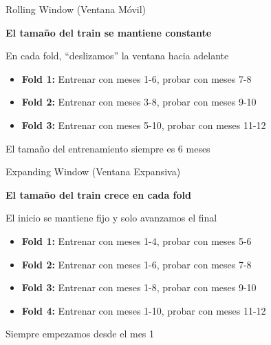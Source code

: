 \documentclass{beamer}
\begin{document}
\begin{frame}{Rolling Window (Ventana Móvil)}
    \begin{center}
        \textbf{El tamaño del train se mantiene constante}
        
        En cada fold, ``deslizamos'' la ventana hacia adelante
        
        \vspace{0.5cm}
        
        \begin{itemize}
            \item \textbf{Fold 1:} Entrenar con meses 1-6, probar con meses 7-8
            \item \textbf{Fold 2:} Entrenar con meses 3-8, probar con meses 9-10
            \item \textbf{Fold 3:} Entrenar con meses 5-10, probar con meses 11-12
        \end{itemize}
        
        \vspace{0.5cm}
        
        El tamaño del entrenamiento siempre es 6 meses
    \end{center}
\end{frame}

\begin{frame}{Expanding Window (Ventana Expansiva)}
    \begin{center}
        \textbf{El tamaño del train crece en cada fold}
        
        El inicio se mantiene fijo y solo avanzamos el final
        
        \vspace{0.5cm}
        
        \begin{itemize}
            \item \textbf{Fold 1:} Entrenar con meses 1-4, probar con meses 5-6
            \item \textbf{Fold 2:} Entrenar con meses 1-6, probar con meses 7-8
            \item \textbf{Fold 3:} Entrenar con meses 1-8, probar con meses 9-10
            \item \textbf{Fold 4:} Entrenar con meses 1-10, probar con meses 11-12
        \end{itemize}
        
        \vspace{0.5cm}
        
        Siempre empezamos desde el mes 1
    \end{center}
\end{frame}
\end{document}
